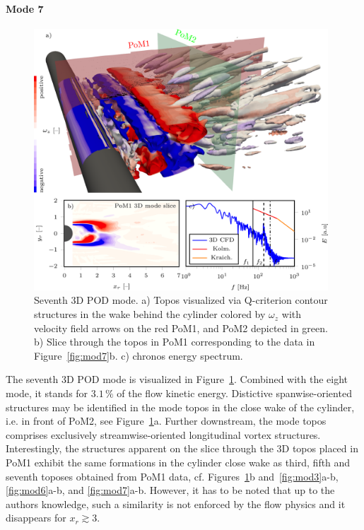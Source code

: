 {{{\paragraph{Mode 7}
\begin{figure}[htbp]
    \centering
    \includegraphics[width=0.98\textwidth]{02_images/00_export/figure22.png}
    \caption{{Seventh 3D POD mode. a)} Topos {visualized via} Q-criterion contour structures in the wake behind the cylinder colored by $\omega_z$ with velocity field arrows on the red PoM1, and PoM2 depicted in green. {b) Slice through the topos in PoM1 corresponding to the data in Figure~\ref{fig:mod7}b. c) chronos energy spectrum.}}
    \label{fig:3Dmod7}
\end{figure}
{The seventh 3D POD mode is visualized in Figure~\ref{fig:3Dmod7}. Combined with the eight mode, it stands for $3.1\,\%$ of the flow kinetic energy. Distictive spanwise-oriented structures may be identified in the mode topos in the close wake of the cylinder, i.e. in front of PoM2, see Figure~\ref{fig:3Dmod7}a. Further downstream, the mode topos comprises exclusively streamwise-oriented longitudinal vortex structures.} Interestingly, the structures apparent on the slice through the 3D topos placed in PoM1 exhibit the same formations in the cylinder close wake as third, fifth and seventh toposes obtained from PoM1 data, cf. Figures~\ref{fig:3Dmod7}b and~\ref{fig:mod3}a-b, \ref{fig:mod6}a-b, and \ref{fig:mod7}a-b. {However, it has to be noted that up to the authors knowledge, such a similarity is not enforced by the flow physics and it disappears} for $x_{r}\gtrsim 3$.


}}}
